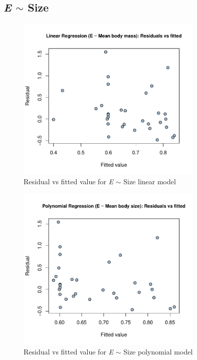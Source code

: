 \documentclass{article}
\begin{document}
\subsection{\emph{E} $\sim$ Size}
\begin{figure}[h]
    \centering
    \includegraphics[width=3.5in]{L_size_rs.pdf}
    \caption{\label{fig:S7} Residual vs fitted value for \emph{E} $\sim$ Size linear model}
\end{figure}
\begin{figure}[h]
    \centering
    \includegraphics[width=3.5in]{p_size_rs.pdf}
    \caption{\label{fig:S8} Residual vs fitted value for \emph{E} $\sim$ Size polynomial model}
\end{figure}
\clearpage
\end{document}

